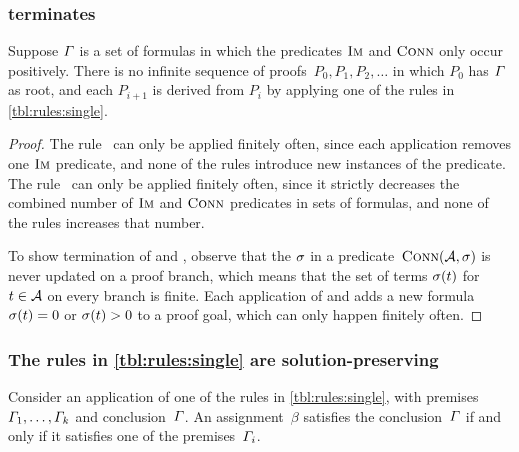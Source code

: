 \subsubsection{\Calculus{} terminates}
\begin{lemma}\label{lma:single-terminates}
  Suppose $\varGamma{}$ is a set of formulas in which the predicates
  $\operatorname{\textsc{Im}}$ and $\operatorname{\textsc{Conn}}$ only occur positively. There is no
  infinite sequence of proofs~$P_0, P_1, P_2, \ldots$ in which $P_0$
  has $\varGamma{}$ as root, and each $P_{i+1}$ is derived from
  $P_i$ by applying one of the rules in \cref{tbl:rules:single}.
\end{lemma}

\begin{proof}
  The rule~\Expand{} can only be applied finitely often, since each
  application removes one $\operatorname{\textsc{Im}}$ predicate, and none of the rules
  introduce new instances of the predicate. The rule~\Subsume{} can
  only be applied finitely often, since it strictly decreases the
  combined number of $\operatorname{\textsc{Im}}$ and $\operatorname{\textsc{Conn}}$ predicates in sets of
  formulas, and none of the rules increases that number.

  To show termination of \Split{} and \Propagate{}, observe that the
  $\operatorname{\sigma}$ in a predicate~$\operatorname{\textsc{Conn}}(\mathcal{A}, \operatorname{\sigma})$ is never
  updated on a proof branch, which means that the set of terms
  $\operatorname{\sigma}(t)$ for $t \in \mathcal{A}$ on every branch is finite. Each
  application of \Split{} and \Propagate{} adds a new
  formula~$\operatorname{\sigma}(t) = 0$ or $\operatorname{\sigma}(t) > 0$
  to a proof goal, which can only happen finitely often.
\end{proof}

\subsubsection{The rules in \cref{tbl:rules:single} are solution-preserving}

\begin{lemma}\label{lma:single-correct}
  Consider an application of one of the rules in
  \cref{tbl:rules:single}, with
  premises~$\varGamma_1, \ldots, \varGamma_k$ and
  conclusion~$\varGamma$. An assignment~$\beta$ satisfies the
  conclusion~$\varGamma$ if and only if it satisfies one of the
  premises~$\varGamma_i$.
\end{lemma}

